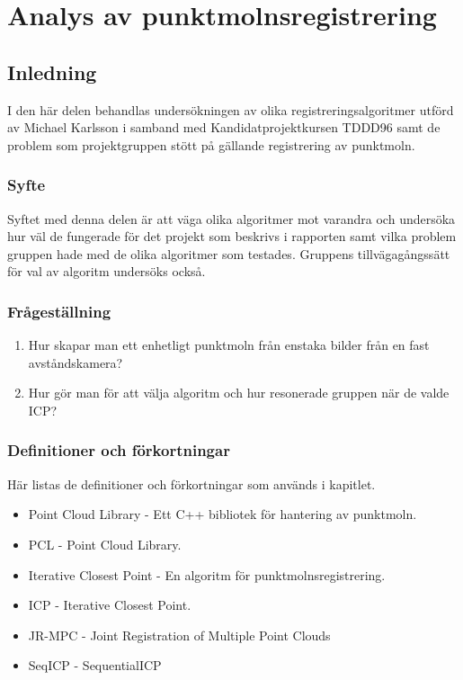 \chapter{Analys av punktmolnsregistrering}
\label{cha:indiv-report-karlsson}


\section{Inledning}
\label{sec:introduction-karlsson}

I den här delen behandlas undersökningen av olika registreringsalgoritmer utförd av Michael Karlsson i samband med Kandidatprojektkursen TDDD96 samt de problem som projektgruppen stött på gällande registrering av punktmoln.

\subsection{Syfte}
\label{sec:purpose-karlsson}

Syftet med denna delen är att väga olika algoritmer mot varandra och undersöka hur väl de fungerade för det projekt som beskrivs i rapporten samt vilka problem gruppen hade med de olika algoritmer som testades. Gruppens tillvägagångssätt för val av algoritm undersöks också.


\subsection{Frågeställning}
\label{sec:issue-karlsson}

\begin{enumerate}
	\item Hur skapar man ett enhetligt punktmoln från enstaka bilder från en fast \newline avståndskamera?
	\item Hur gör man för att välja algoritm och hur resonerade gruppen när de valde ICP?	
\end{enumerate}

\subsection{Definitioner och förkortningar}
\label{sec:definitions-acronyms-karlsson}

Här listas de definitioner och förkortningar som används i kapitlet.

\begin{itemize}
	\item Point Cloud Library\cite{pcl_home} - Ett C++ bibliotek för hantering av punktmoln.
	\item PCL - Point Cloud Library.
	\item Iterative Closest Point - En algoritm för punktmolnsregistrering.
	\item ICP - Iterative Closest Point.
	\item JR-MPC - Joint Registration of Multiple Point Clouds
	\item SeqICP - SequentialICP
\end{itemize}


